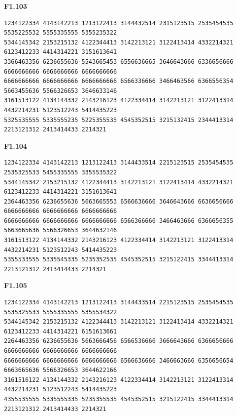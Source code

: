 \noindent\begin{minipage}{\linewidth}\textbf{F1.103}
\begin{lstlisting}
1234122334 4143142213 1213122413 3144432514 2315123515 2535454535 5535225532 5555335555 5355235322
5344145342 2153215132 4122344413 3142213121 3122413414 4332214321 6123412233 4414314221 3151613641
3366463356 6236655636 5543665453 6556636665 3646643666 6336656666 6666666666 6666666666 6666666666
6666666666 6666666666 6666666666 6566336666 3466463566 6366556354 5663455636 5566326653 3646633146
3161513122 4134144332 2143216123 4122334414 3142213121 3122413314 4432214231 5123512243 5414435223
5325535555 5335555235 5225355535 4545352515 3215132415 2344413314 2213121312 2413414433 2214321
\end{lstlisting}
\end{minipage}\par\smallskip

\noindent\begin{minipage}{\linewidth}\textbf{F1.104}
\begin{lstlisting}
1234122334 4143142213 1213122413 3144433514 2215123515 2535454535 2535325533 5455335555 3355535322
5344145342 2153215132 4122344413 3142213121 3122413414 4332214321 6123412233 4414314221 3151613641
2364463356 6236655636 5663665553 6566636666 3646643666 6636656666 6666666666 6666666666 6666666666
6666666666 6666666666 6666666666 6566366666 3466463666 6366656355 5663665636 5566326653 3644632146
3161513122 4134144332 2143216123 4122334414 3142213121 3122413314 4432214231 5123512243 5414435223
5355533555 5335545335 5235352535 4545352515 3215122415 3344413314 2213121312 2413414433 2214321
\end{lstlisting}
\end{minipage}\par\smallskip

\noindent\begin{minipage}{\linewidth}\textbf{F1.105}
\begin{lstlisting}
1234122334 4143142213 1213122413 3144433514 2215123515 2535454535 5535325533 5555335555 5355534322
5344145342 2153215132 4122344413 3142213121 3122413414 4332214321 6123412233 4414314221 6151613661
2264463356 6236655636 5663666456 6566536666 3666643666 6366656666 6666666666 6666666666 6666666666
6666666666 6666666666 6666666666 6566636666 3466663666 6356656654 6663665636 5566326653 3644622166
3161516122 4134144332 2143216123 4122334414 3142213121 3122413314 4432214231 5123512243 5414435223
4355535555 5335555335 5235355535 4545352515 3215122415 3344413314 2213121312 2413414433 2214321
\end{lstlisting}
\end{minipage}\par\smallskip


